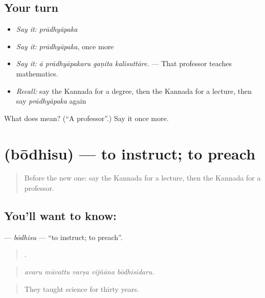 \subsection*{Your turn}
\begin{itemize}
\raggedright
  \item \emph{Say it:} \emph{prādhyāpaka}
  \item \emph{Say it:} \emph{prādhyāpaka}, once more
  \item \emph{Say it:} \emph{ā prādhyāpakaru gaṇita kalisuttāre.} — That professor teaches mathematics.
  \item \emph{Recall:} say the Kannada for a degree, then the Kannada for a lecture, then say \emph{prādhyāpaka} again
\end{itemize}

\begin{tcolorbox}[breakable,colback=teal!4,colframe=teal!35!black,title={Before you move on}]
What does  mean? (\textquotedblleft{}A professor\textquotedblright{}.) Say it once more.
\end{tcolorbox}
\section[\texorpdfstring{\kn{ಬೋಧಿಸು} (bōdhisu)}{ಬೋಧಿಸು (bōdhisu)}]{ (bōdhisu) — to instruct; to preach}

\label{lesson:KA-C406-bodhisu}



\begin{quote}
Before the new one: say the Kannada for a lecture, then the Kannada for a professor.
\end{quote}

\subsection*{You'll want to know: }
\textbf{} — \emph{bōdhisu} — \textquotedblleft{}to instruct; to preach\textquotedblright{}.

\begin{quote}
    .
\end{quote}

\begin{quote}
\emph{avaru mūvattu varṣa vijñāna bōdhisidaru.}
\end{quote}

\begin{quote}
They taught science for thirty years.
\end{quote}

